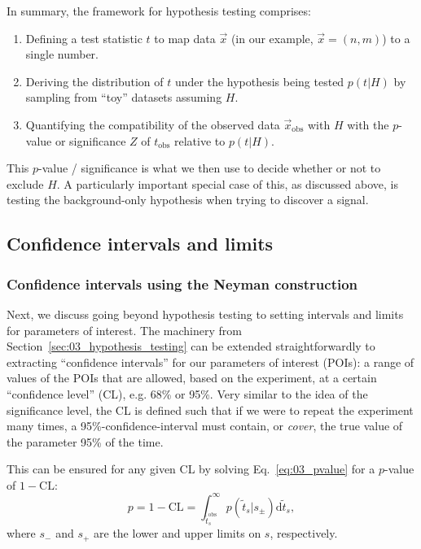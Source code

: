 
In summary, the framework for hypothesis testing comprises:

\begin{enumerate}
    \item Defining a test statistic $t$ to map data $\vec{x}$ (in our example, $\vec{x} = (n, m)$) to a single number.
    \item Deriving the distribution of $t$ under the hypothesis being tested $p(t|H)$ by sampling from ``toy'' datasets assuming $H$.
    \item Quantifying the compatibility of the observed data $\vec{x}_\mathrm{obs}$ with $H$ with the $p$-value or significance $Z$ of $t_\mathrm{obs}$ relative to $p(t|H)$.
\end{enumerate}

This $p$-value / significance is what we then use to decide whether or not to exclude $H$. 
A particularly important special case of this, as discussed above, is testing the background-only hypothesis when trying to discover a signal.

\subsection{Confidence intervals and limits}
\label{sec:03_intervals}

\subsubsection{Confidence intervals using the Neyman construction}

Next, we discuss going beyond hypothesis testing to setting intervals and limits for parameters of interest.
The machinery from Section~\ref{sec:03_hypothesis_testing} can be extended straightforwardly to extracting ``confidence intervals'' for our parameters of interest (POIs): a range of values of the POIs that are allowed, based on the experiment, at a certain ``confidence level'' (CL), e.g. 68\% or 95\%. 
Very similar to the idea of the significance level, the CL is defined such that if we were to repeat the experiment many times, a 95\%-confidence-interval must contain, or \textit{cover}, the true value of the parameter 95\% of the time. 

This can be ensured for any given CL by solving Eq.~\ref{eq:03_pvalue} for a $p$-value of $1 - \mathrm{CL}$: 
\begin{equation}
p = 1 - \mathrm{CL} = \int_{\tilde{t}^\mathrm{obs}_s}^{\infty}p(\tilde{t}_s|s_\pm)\mathrm d \tilde{t}_s,
\label{eq:03_cl}
\end{equation}
where $s_-$ and $s_+$ are the lower and upper limits on $s$, respectively.

